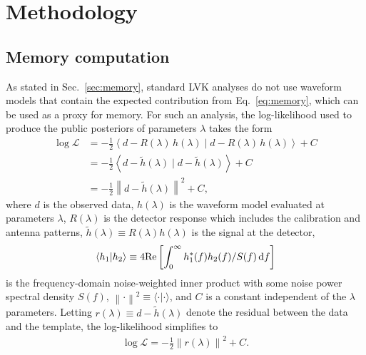 \documentclass[aps,prd,reprint,twocolumn,10pt,eqsecnum,showpacs,nofootinbib,amsfonts,amssymb,amsmath,longbibliography,superscriptaddress,floatfix]{revtex4-1}
\begin{document}
\section{Methodology}
\label{sec:methodology}

\subsection{Memory computation}

As stated in Sec.~\ref{sec:memory}, standard LVK analyses do not use waveform models that contain the expected contribution from Eq.~\eqref{eq:memory}, which can be used as a proxy for memory. For such an analysis, the log-likelihood used to produce the public posteriors of parameters $\lambda$ takes the form
\begin{align}
	\log\mathcal{L}&=-\frac{1}{2}\left\langle d- R(\lambda)\, h(\lambda) \mid d-R(\lambda)\, h(\lambda)\right\rangle+C\nonumber\\
	&=-\frac{1}{2}\left\langle d-\tilde{h}(\lambda) \mid d-\tilde{h}(\lambda)\right\rangle+C\nonumber\\
	&=-\frac{1}{2}\left\|d-\tilde{h}(\lambda)\right\|^2+C,
\end{align}
where $d$ is the observed data, $h(\lambda)$ is the waveform model evaluated at parameters $\lambda$, $R(\lambda)$ is the detector response which includes the calibration and antenna patterns, $\tilde{h}(\lambda)\equiv R(\lambda)h(\lambda)$ is the signal at the detector,
\begin{align}
	\langle h_{1} | h_{2} \rangle \equiv 4 \mathrm{Re}\left[\int_0^\infty h_{1}^{*}(f) h_{2}(f)/S(f)\,{\rm d}f\right]
\end{align}
is the frequency-domain noise-weighted inner product with some noise power spectral density $S(f)$, $\left\| \cdot \right\|^2\equiv\langle \cdot | \cdot \rangle$, and $C$ is a constant independent of the $\lambda$ parameters. Letting $r(\lambda)\equiv d-\tilde{h}(\lambda)$ denote the residual between the data and the template, the log-likelihood simplifies to
\begin{align}
	\log\mathcal{L}=-\frac{1}{2}\left\|r(\lambda)\right\|^2+C.
\end{align}
\end{document}
